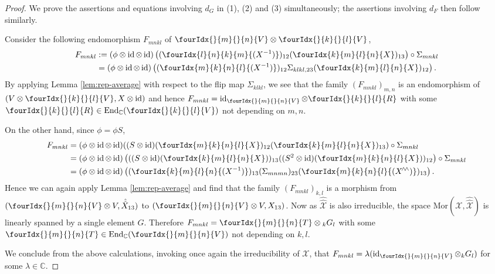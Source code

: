 \documentclass[10pt]{article}
\DeclareMathOperator{\End}{\mathrm{End}}
\DeclareMathOperator{\id}{id}
\newcommand{\C}{\mathbb{C}}
\newcommand{\Mor}{\mathrm{Mor}}
\newcommand{\GrDA}[3]{{}_{#2}#1_{#3}} %
\newcommand{\Gr}[5]{\fourIdx{#2}{#4}{#3}{#5}{#1}}%
\newcommand{\Gru}[3]{\Gr{#1}{}{}{#2}{#3}}
\theoremstyle{definition}
\numberwithin{equation}{section}
\begin{document}
\begin{proof}
  We prove the assertions and equations involving $d_G$ in (1), (2)
  and (3)  simultaneously; the assertions involving $d_F$ then  follow similarly.

  Consider
  the following endomorphism $F_{mnkl}$ of $\Gru{V}{m}{n}\otimes \Gru{V}{k}{l}$, 
  \begin{align*}
    F_{mnkl}
    &:=(\phi \otimes \id \otimes \id)\left((\Gr{(X^{-1})}{l}{k}{n}{m})_{12}(\Gr{X}{k}{l}{m}{n})_{13}\right)
    \circ \Sigma_{mnkl} \\ &= (\phi \otimes \id \otimes
    \id)\left((\Gr{(X^{-1})}{m}{n}{k}{l})_{12}
      \Sigma_{klkl,23}(\Gr{X}{k}{l}{m}{n})_{12}\right).
  \end{align*}
  By applying Lemma \ref{lem:rep-average} with respect to the flip map $\Sigma_{klkl}$, we see that the family $(F_{mnkl})_{m,n}$ is
  an endomorphism of $(V \otimes \Gru{V}{k}{l}, X\otimes \id)$ and hence
  $F_{mnkl} = \id_{\Gru{V}{m}{n}} \otimes \Gru{R}{k}{l}$ with some $\Gru{R}{k}{l} \in \End_{\C}(\Gru{V}{k}{l})$ not
  depending on $m,n$. 
  
  On the other hand, since $\phi = \phi S$,
  \begin{align*}
    F_{mnkl} &= (\phi \otimes \id \otimes \id)((S \otimes
    \id)(\Gr{X}{m}{n}{k}{l})_{12}(\Gr{X}{k}{l}{m}{n})_{13})
    \circ \Sigma_{mnkl} \\
    &= (\phi \otimes \id \otimes \id)\left(((S \otimes
      \id)(\Gr{X}{k}{l}{m}{n}))_{13}
      ((S^{2} \otimes \id)(\Gr{X}{m}{n}{k}{l}))_{12}\right)     \circ \Sigma_{mnkl}\\
    &= (\phi \otimes \id \otimes
    \id)\left((\Gr{(X^{-1})}{k}{l}{m}{n})_{13} (\Sigma_{mnmn})_{23}
      (\Gr{(X^{\!\wedge \!\wedge})}{m}{n}{k}{l})_{13}\right).
  \end{align*}
  Hence we can again apply Lemma \ref{lem:rep-average} and
  find that the family $(F_{mnkl})_{k,l}$ is a morphism from $(\Gru{V}{m}{n} \otimes V, \hat{\hat{X}}_{13})$ to $(\Gru{V}{m}{n} \otimes V,
 X_{13})$. Now as $\hat{\hat{\mathscr{X}}}$ is also irreducible, the space $\Mor(\mathscr{X},\hat{\hat{\mathscr{X}}})$ is linearly spanned by a single element $G$. Therefore $F_{mnkl} = \Gru{T}{m}{n} \otimes \GrDA{G}{k}{l}$
  with some $\Gru{T}{m}{n} \in \mathcal{\End_{\C}}(\Gru{V}{m}{n})$
  not depending on $k,l$. 
  
  We conclude from the above calculations, invoking once again the irreducibility of $\mathscr{X}$, that $F_{mnkl} = \lambda
  (\id_{\Gru{V}{m}{n}} \otimes \GrDA{G}{k}{l})$  for some $\lambda\in \C$.
   

\end{proof}
\end{document}
